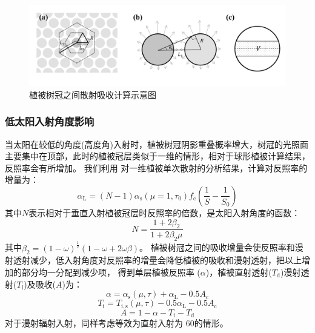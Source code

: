 {
  \begin{figure}[htbp]
    \centering
    \includegraphics[width=0.95\columnwidth]{Figures/辐射过程及辐射通量计算/散射吸收计算示意图.png}
    \caption{植被树冠之间散射吸收计算示意图}
    \label{fig:散射吸收计算示意图}
  \end{figure}
}

\subsubsection{低太阳入射角度影响}
当太阳在较低的角度(高度角)入射时，植被树冠阴影重叠概率增大，树冠的光照面主要集中在顶部，此时的植被冠层类似于一维的情形，相对于球形植被计算结果，反照率会有所增加。
我们利用 \citet{dickinson1983land} 对一维植被单次散射的分析结果，计算对反照率的增量为：
\begin{equation}
  \alpha_{\mathrm{L}}=(N-1) \alpha_{\mathrm{s}}\left(\mu=1, \tau_{0}\right) f_{\mathrm{c}}\left(\frac{1}{S}-\frac{1}{S_{0}}\right)
\end{equation}
其中$N$表示相对于垂直入射植被冠层时反照率的倍数，是太阳入射角度的函数：
\begin{equation}
  N=\frac{1+2 \beta_{2}}{1+2 \beta_{2} \mu}
\end{equation}
其中$\beta_2=\left(1-\omega\right)^\frac{1}{2}(1-\omega+2\omega\beta)$。
植被树冠之间的吸收增量会使反照率和漫射透射减少，低入射角度对反照率的增量会降低植被的吸收和漫射透射，把以上增加的部分均一分配到减少项，
得到单层植被反照率 ($\alpha$)，植被直射透射($T_{\mathrm d}$)漫射透射($T_{\mathrm i}$)及吸收($A$)为：
\begin{equation}
  \alpha=\alpha_{\mathrm{s}}(\mu, \tau)+\alpha_{\mathrm{L}}-0.5 A_{\mathrm{c}}
\end{equation}
\begin{equation}
  T_{\mathrm{i}}=T_{\mathrm{i, s}}(\mu, \tau)-0.5 \alpha_{\mathrm{L}}-0.5 A_{\mathrm{c}}
\end{equation}
\begin{equation}
  A=1-\alpha-T_{\mathrm{i}}-T_{\mathrm{d}}
\end{equation}
对于漫射辐射入射，同样考虑等效为直射入射为 60\textdegree 的情形。

